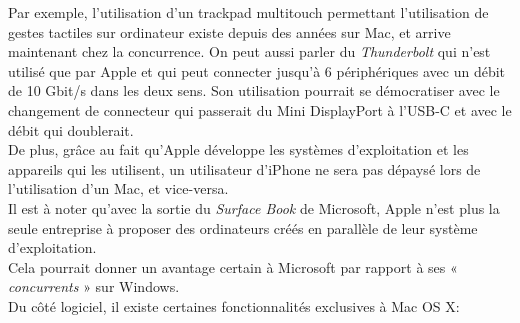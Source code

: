 Par exemple, l'utilisation d'un trackpad multitouch permettant l'utilisation de
gestes tactiles sur ordinateur existe depuis des années sur Mac, et arrive
maintenant chez la concurrence. On peut aussi parler du \textit{Thunderbolt} qui
n'est utilisé que par Apple et qui peut connecter jusqu'à 6 périphériques avec
un débit de 10 Gbit/s dans les deux sens. Son utilisation pourrait se démocratiser
avec le changement de connecteur qui passerait du Mini DisplayPort à l'USB-C et
avec le débit qui doublerait. \\

De plus, grâce au fait qu'Apple développe les systèmes d'exploitation et les
appareils qui les utilisent, un utilisateur d'iPhone ne sera pas dépaysé lors
de l'utilisation d'un Mac, et vice-versa. \\
Il est à noter qu'avec la sortie du \textit{Surface Book} de Microsoft,
Apple n'est plus la seule entreprise à proposer des ordinateurs créés en
parallèle de leur système d'exploitation. \\ Cela pourrait donner un avantage
certain à Microsoft par rapport à ses « \textit{concurrents} » sur Windows. \\

Du côté logiciel, il existe certaines fonctionnalités exclusives à Mac OS X:
\\

